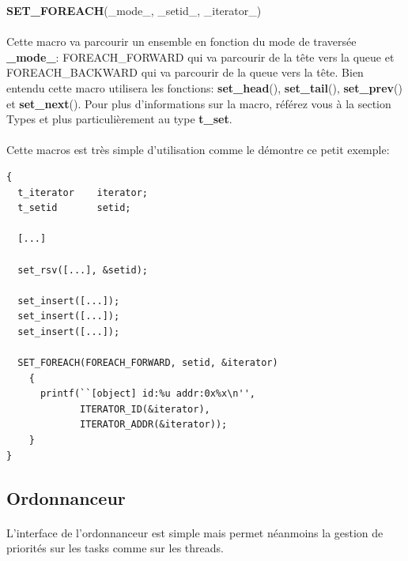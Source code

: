 \documentclass[10pt,a4wide]{article}
\begin{document}
\hspace{1.5cm}\textbf{SET\_FOREACH}(\_mode\_, \_setid\_, \_iterator\_)

\paragraph{}

Cette macro va parcourir un ensemble en fonction du mode de travers\'ee
\textbf{\_mode\_}: FOREACH\_FORWARD qui va parcourir de la t\^ete vers
la queue et FOREACH\_BACKWARD qui va parcourir de la queue vers la t\^ete.
Bien entendu cette macro utilisera les fonctions: \textbf{set\_head}(),
\textbf{set\_tail}(), \textbf{set\_prev}() et \textbf{set\_next}().
Pour plus d'informations sur la macro, r\'ef\'erez vous \`a la section
Types et plus particuli\`erement au type \textbf{t\_set}.

\paragraph{}

Cette macros est tr\`es simple d'utilisation comme le d\'emontre ce
petit exemple:

\begin{verbatim}
{
  t_iterator    iterator;
  t_setid       setid;

  [...]

  set_rsv([...], &setid);

  set_insert([...]);
  set_insert([...]);
  set_insert([...]);

  SET_FOREACH(FOREACH_FORWARD, setid, &iterator)
    {
      printf(``[object] id:%u addr:0x%x\n'',
             ITERATOR_ID(&iterator),
             ITERATOR_ADDR(&iterator));
    }
}
\end{verbatim}

\subsection{Ordonnanceur}

\paragraph{}

L'interface de l'ordonnanceur est simple mais permet n\'eanmoins la gestion
de priorit\'es sur les tasks comme sur les threads.

\paragraph{}
\end{document}
